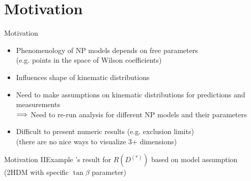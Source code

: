 \section{Motivation}
\begin{frame}{Motivation}
	\begin{itemize}
		\item Phenomenology of NP models depends on free parameters \\{\footnotesize(e.g. points in the space of Wilson coefficients)}
		\item Influences shape of kinematic distributions
	\end{itemize} 
	
	\bigskip
	\begin{itemize}
		\item Need to make assumptions on kinematic distributions for predictions and measurements\\
		$\Longrightarrow$ Need to re-run analysis for different NP models and their parameters
		\item Difficult to present numeric results (e.g. exclusion limits)\\
		{\footnotesize (there are no nice ways to visualize 3+ dimensions)}\\
	\end{itemize}
\end{frame}
%
\begin{frame}[t]{Motivation II}{Example}
	's result for $R(D^{(*)})$ based on model assumption\\
	{\footnotesize(2HDM with specific $\tan\beta$ parameter)}\\
			
	\medskip
	\begin{center}
	\end{center}
\end{frame}
